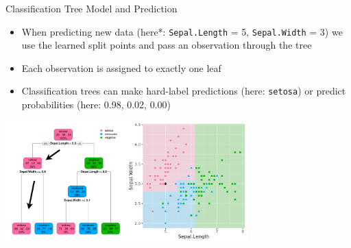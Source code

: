 \documentclass[11pt,compress,t,notes=noshow, xcolor=table]{beamer}
\begin{document}
\begin{vbframe}{Classification Tree Model and Prediction}
\begin{itemize}
\item When predicting new data (here*: \texttt{Sepal.Length} = 5, \texttt{Sepal.Width} = 3) we use the learned split points and pass an observation through the tree
\item Each observation is assigned to exactly one leaf
\item Classification trees can make hard-label predictions (here: \texttt{setosa}) or predict probabilities (here: 0.98, 0.02, 0.00)
\end{itemize}

\color{fgcolor}
{\centering \includegraphics[width=0.7\textwidth, keepaspectratio]{figure/no-points-classif-depth3.pdf}

}
\end{vbframe}
\end{document}
